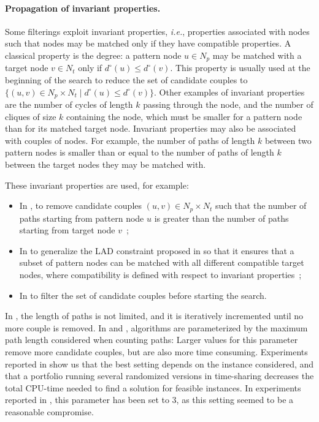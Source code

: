 \documentclass{llncs}
\begin{document}
\paragraph{Propagation of invariant properties.}

Some filterings exploit invariant properties, {\em i.e.}, properties associated with nodes such that nodes may be matched only if they have compatible properties. A classical property is the degree: a pattern node $u\in N_p$ may be matched with a target node $v\in N_t$ only if $d^\circ(u)\leq d^\circ(v)$. This property is usually used at the beginning of the search to reduce the set of candidate couples to $\{(u,v)\in N_p\times N_t\;|\;d^\circ(u)\leq d^\circ(v)\}$.
Other examples of invariant properties are the number of cycles of length $k$ passing through the node, and the number of cliques of size $k$ containing the node, which must be smaller for a pattern node than for its matched target node.
Invariant properties may also be associated with couples of nodes. For example, the number of paths of length $k$ between two pattern nodes is smaller than or equal to the number of paths of length $k$ between the target nodes they may be matched with. 

These invariant properties are used, for example:
\begin{itemize}
\item  In \cite{battiti-mascia07}, to remove candidate couples $(u,v)\in N_p\times N_t$ such that the number of paths starting from  pattern node $u$ is greater than the number of paths starting from  target node $v$~;
\item In \cite{Audemard:2014} to generalize the LAD constraint proposed in \cite{Solnon:2010} so that it ensures that a subset of pattern nodes can be matched with all different compatible target nodes, where compatibility is defined with respect to invariant properties~;
\item In \cite{McCreesh:2015} to filter the set of candidate couples before starting the search.
\end{itemize}
In \cite{Audemard:2014} , the length of paths is not limited, and it is iteratively incremented until no more couple is removed. In \cite{battiti-mascia07} and \cite{McCreesh:2015},  algorithms are parameterized by the maximum path length considered when counting paths: Larger values for this parameter remove more candidate couples, but are also more time consuming. Experiments reported in \cite{battiti-mascia07} show us that the best setting depends on the instance considered, and that a portfolio running several randomized 
versions in time-sharing decreases the total CPU-time needed to find a solution for feasible instances. In experiments reported in \cite{McCreesh:2015}, this parameter has been set to 3, as this setting seemed to be a reasonable compromise.
\end{document}
